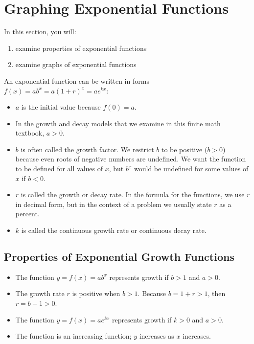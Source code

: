 \section{Graphing Exponential Functions}

In this section, you will:
\begin{enumerate}
    \item examine properties of exponential functions
    \item examine graphs of exponential functions
\end{enumerate}


An exponential function can be written in forms \(f(x) = ab^x = a(1 + r)^x = ae^{kx}\):
\begin{itemize}
    \item \(a\) is the initial value because \(f(0) = a\).
    \item In the growth and decay models that we examine in this finite math textbook, \(a > 0\).
    \item \(b\) is often called the growth factor. We restrict \(b\) to be positive (\(b > 0\)) because even roots of negative numbers are undefined. We want the function to be defined for all values of \(x\), but \(b^x\) would be undefined for some values of \(x\) if \(b<0\).
    \item \(r\) is called the growth or decay rate. In the formula for the functions, we use \(r\) in decimal form, but in the context of a problem we usually state \(r\) as a percent.
    \item \(k\) is called the continuous growth rate or continuous decay rate.
\end{itemize}

\subsection{Properties of Exponential Growth Functions}

\begin{itemize}
    \item The function \(y = f(x) = ab^x\) represents growth if \(b > 1\) and \(a > 0\).
    \item The growth rate \(r\) is positive when \(b>1\). Because \(b = 1 + r > 1\), then \(r = b - 1 > 0\).
    \item The function \(y = f(x) = ae^{kx}\) represents growth if \(k > 0\) and \(a > 0\).
    \item The function is an increasing function; \(y\) increases as \(x\) increases.
\end{itemize}

